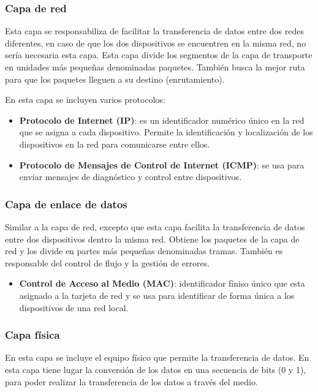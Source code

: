 \subsubsection{Capa de red}
\label{subsubsec:CapaRed}
Esta capa se responsabiliza de facilitar la transferencia de datos entre dos redes diferentes, en caso de que los dos dispositivos se encuentren en la misma red, no sería necesaria esta capa. Esta capa divide los segmentos de la capa de transporte en unidades más pequeñas denominadas paquetes. También busca la mejor ruta para que los paquetes lleguen a su destino (enrutamiento).

En esta capa se incluyen varios protocolos:
\begin{itemize}
    \item \textbf{Protocolo de Internet (IP)}: es un identificador numérico único en la red que se asigna a cada dispositivo. Permite la identificación y localización de los dispositivos en la red para comunicarse entre ellos. 
    \item \textbf{Protocolo de Mensajes de Control de Internet (ICMP)}: se usa para enviar mensajes de diagnóstico y control entre dispositivos.
\end{itemize}

\subsubsection{Capa de enlace de datos}
\label{subsubsec:CapaEnlaceDatos}
Similar a la capa de red, excepto que esta capa facilita la transferencia de datos entre dos dispositivos dentro la misma red. Obtiene los paquetes de la capa de red y los divide en partes más pequeñas denominadas tramas. También es responsable del control de flujo y la gestión de errores.

\begin{itemize}
    \item \textbf{Control de Acceso al Medio (MAC)}: identificador fíniso único que esta asignado a la tarjeta de red y se usa para identificar de forma única a los dispositivos de una red local.
\end{itemize}

\subsubsection{Capa física}
\label{subsubsec:CapaFisica}
En esta capa se incluye el equipo físico que permite la transferencia de datos. En esta capa tiene lugar la conversión de los datos en una secuencia de bits (0 y 1), para poder realizar la transferencia de los datos a través del medio.

